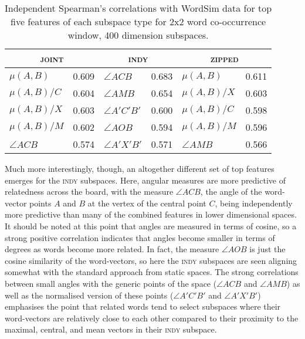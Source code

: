 \begin{table}
\centering
\begin{tabular}{lr|lr|lr}
\hline
\multicolumn{2}{c}{\textsc{joint}} & \multicolumn{2}{c}{\textsc{indy}} & \multicolumn{2}{c}{\textsc{zipped}} \\
\hline
$\mu (A,B)$ & 0.609 & $\angle ACB$ & 0.683 & $\mu (A,B)$ & 0.611 \\
$\mu (A,B)/C$ & 0.604 & $\angle AMB$ & 0.654 & $\mu (A,B)/X$ & 0.603 \\
$\mu (A,B)/X$ & 0.603 & $\angle A'C'B'$ & 0.600 & $\mu (A,B)/C$ & 0.598 \\
$\mu (A,B)/M$ & 0.602 & $\angle AOB$ & 0.594 & $\mu (A,B)/M$ & 0.596 \\
$\angle ACB$ & 0.574 & $\angle A'X'B'$ & 0.571 & $\angle AMB$ & 0.566 \\
\hline
\end{tabular}
\caption{Independent Spearman's correlations with WordSim data for top five features of each subspace type for 2x2 word co-occurrence window, 400 dimension subspaces.}
\label{tab:ind-related}
\end{table}

Much more interestingly, though, an altogether different set of top features emerges for the \textsc{indy} subspaces.  Here, angular measures are more predictive of relatedness across the board, with the measure $\angle ACB$, the angle of the word-vector points $A$ and $B$ at the vertex of the central point $C$, being independently more predictive than many of the combined features in lower dimensional spaces.  It should be noted at this point that angles are measured in terms of cosine, so a strong positive correlation indicates that angles become smaller in terms of degrees as words become more related.  In fact, the measure $\angle AOB$ is just the cosine similarity of the word-vectors, so here the \textsc{indy} subspaces are seen aligning somewhat with the standard approach from static spaces.  The strong correlations between small angles with the generic points of the space ($\angle ACB$ and $\angle AMB$) as well as the normalised version of these points ($\angle A'C'B'$ and $\angle A'X'B'$) emphasises the point that related words tend to select subspaces where their word-vectors are relatively close to each other compared to their proximity to the maximal, central, and mean vectors in their \textsc{indy} subspace.

